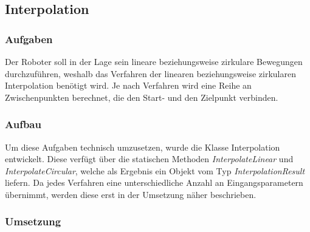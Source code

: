 
\subsection{Interpolation}

\subsubsection{Aufgaben}
Der Roboter soll in der Lage sein lineare beziehungsweise zirkulare Bewegungen durchzuführen, weshalb das Verfahren der linearen beziehungsweise zirkularen Interpolation benötigt wird. Je nach Verfahren wird eine Reihe an Zwischenpunkten berechnet, die den Start- und den Zielpunkt verbinden.

\subsubsection{Aufbau}
Um diese Aufgaben technisch umzusetzen, wurde die Klasse Interpolation entwickelt. Diese verfügt über die statischen Methoden \textit{InterpolateLinear} und \textit{InterpolateCircular}, welche als Ergebnis ein Objekt vom Typ \textit{InterpolationResult} liefern. Da jedes Verfahren eine unterschiedliche Anzahl an Eingangsparametern übernimmt, werden diese erst in der Umsetzung näher beschrieben.

\subsubsection{Umsetzung}

